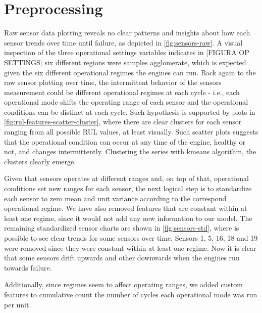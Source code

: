 \documentclass[letterpaper, 10 pt, conference, onecolumn]{ieeeconf}  %
\begin{document}
\section{Preprocessing}\label{sec:preprocess}
Raw sensor data plotting reveals no clear patterns and insights about how each sensor trends over time until failure, as depicted in \autoref{fig:sensors-raw}. A visual inspection of the three operational settings variables indicates in [FIGURA OP SETTINGS] six different regions were samples agglomerate, which is expected given the six different operational regimes the engines can run. Back again to the raw sensor plotting over time, the intermittent behavior of the sensors measurement could be different operational regimes at each cycle - i.e., each operational mode shifts the operating range of each sensor and the operational conditions can be distinct at each cycle. Such hypothesis is supported by plots in \autoref{fig:rul-features-scatter-cluster}, where there are clear clusters for each sensor ranging from all possible RUL values, at least visually. Such scatter plots suggests that the operational condition can occur at any time of the engine, healthy or not, and changes intermittently. Clustering the series with kmeans algorithm, the clusters clearly emerge. 

Given that sensors operates at different ranges and, on top of that, operational conditions set new ranges for each sensor, the next logical step is to standardize each sensor to zero mean and unit variance according to the correspond operational regime. We have also removed features that are constant within at least one regime, since it would not add any new information to our model. The remaining standardized sensor charts are shown in \autoref{fig:sensors-std}, where is possible to see clear trends for some sensors over time. Sensors 1, 5, 16, 18 and 19 were removed since they were constant within at least one regime. Now it is clear that some sensors drift upwards and other downwards when the engines run towards failure. 

Additionally, since regimes seem to affect operating ranges, we added custom features to cumulative count the number of cycles each operational mode was run per unit.
\end{document}
